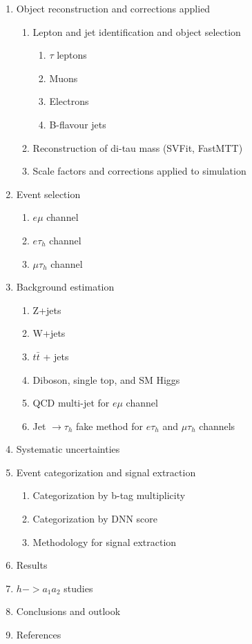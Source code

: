 \documentclass{article}
\begin{document}
\begin{enumerate}
    \item Object reconstruction and corrections applied
        \begin{enumerate}
            \item Lepton and jet identification and object selection
                \begin{enumerate}
                    \item $\tau$ leptons
                    \item Muons 
                    \item Electrons
                    \item B-flavour jets
                \end{enumerate}
            \item Reconstruction of di-tau mass (SVFit, FastMTT)
            \item Scale factors and corrections applied to simulation
        \end{enumerate}
    \item Event selection 
        \begin{enumerate}
            \item $e\mu$ channel
            \item $e\tau_{h}$ channel
            \item $\mu\tau_{h}$ channel
        \end{enumerate}
    \item Background estimation 
        \begin{enumerate}
            \item Z+jets
            \item W+jets
            \item $t\bar{t}$ + jets
            \item Diboson, single top, and SM Higgs
            \item QCD multi-jet for $e\mu$ channel
            \item Jet $\rightarrow \tau_{h}$ fake method for $e\tau_{h}$ and $\mu\tau_{h}$ channels
        \end{enumerate}
    \item Systematic uncertainties
    \item Event categorization and signal extraction
        \begin{enumerate}
            \item Categorization by b-tag multiplicity
            \item Categorization by DNN score
            \item Methodology for signal extraction
        \end{enumerate}
    \item Results
    \item $h->a_1 a_2$ studies
    \item Conclusions and outlook
    \item References
\end{enumerate}
\end{document}
